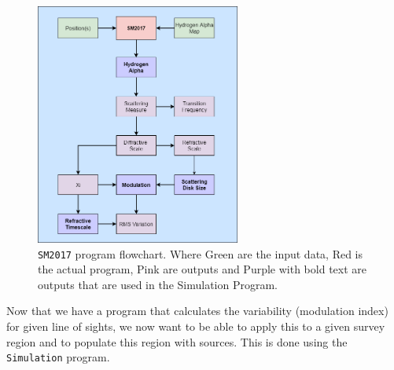 \documentclass[a4paper, 10pt]{article}
\begin{document}
\begin{figure}[H]
    \centering
    \includegraphics[width=0.6\textwidth]{SM2017.png}
    \caption{\texttt{SM2017} program flowchart. Where Green are the input data, Red is the actual program, Pink are outputs and Purple with bold text are outputs that are used in the Simulation Program.}
    \label{fig:SM}
\end{figure}

Now that we have a program that calculates the variability (modulation index) for given line of sights, we now want to be able to apply this to a given survey region and to populate this region with sources. This is done using the \texttt{Simulation} program.
\end{document}
